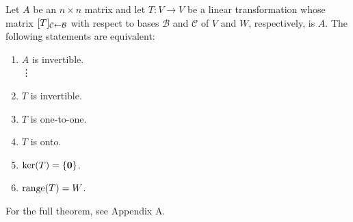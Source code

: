\documentclass[../m73main.tex]{chapters}
\begin{document}
\begin{theorem}
	Let $A$ be an $n\times n$ matrix and let $T : V \to V$ be a linear transformation whose matrix $[T]_{\mathcal{C} \leftarrow \mathcal{B}}$ with respect to bases $\mathcal{B}$ and $\mathcal{C}$ of $V$ and $W$, respectively, is $A$.
	The following statements are equivalent:
	\begin{enumerate}[label=(\alph*)]
		\item $A$ is invertible. \\
		\phantom{~}\hspace{-19.5pt} \vdots
		\setcounter{enumi}{15}
		\item $T$ is invertible.
		\item $T$ is one-to-one.
		\item $T$ is onto.
		\item $\textrm{ker}(T) = \{\mathbf{0}\}$.
		\item $\textrm{range}(T) = W$.
	\end{enumerate}
	For the full theorem, see Appendix A.
\end{theorem}
\end{document}

